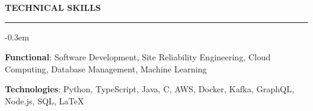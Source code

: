 \documentclass{cv}
\begin{document}

\sectionskip


\textbf{\uppercase{Technical Skills}}
\sectionlineskip
\hrule height 0.1em
\begin{list}{}{\setlength{\leftmargin}{0em}}
\itemsep -0.3em
\item
    \textbf{Functional}: Software Development, Site Reliability Engineering, Cloud Computing, Database Management, Machine Learning
\item
    \textbf{Technologies}: Python, TypeScript, Java, C, AWS, Docker, Kafka, GraphQL, Node.js, SQL, \LaTeX
\end{list}


\sectionskip

\end{document}
